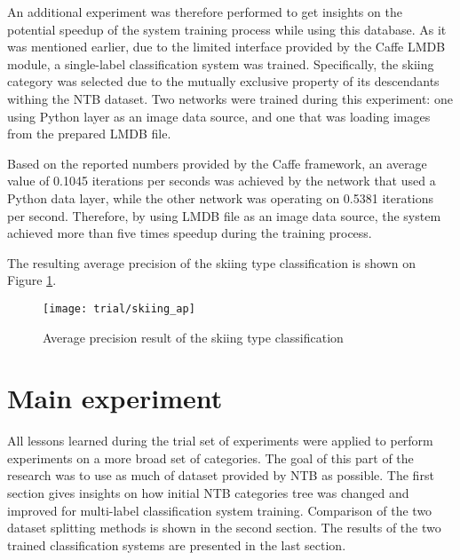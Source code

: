     An additional experiment was therefore performed to get insights on the potential speedup of the system training process while using this database. As it was mentioned earlier, due to the limited interface provided by the Caffe LMDB module, a single-label classification system was trained. Specifically, the skiing category was selected due to the mutually exclusive property of its descendants withing the NTB dataset. Two networks were trained during this experiment: one using Python layer as an image data source, and one that was loading images from the prepared LMDB file.
    
    Based on the reported numbers provided by the Caffe framework, an average value of 0.1045 iterations per seconds was achieved by the network that used a Python data layer, while the other network was operating on 0.5381 iterations per second. Therefore, by using LMDB file as an image data source, the system achieved more than five times speedup during the training process. 
    
    The resulting average precision of the skiing type classification is shown on Figure \ref{fig:trial-skiing-ap}.
    
    \begin{figure}[H]
        \centering
        \texttt{[image: trial/skiing\_ap]}
        \caption[Trial experiment. Average precision result of the skiing type classification]{Average precision result of the skiing type classification}
        \label{fig:trial-skiing-ap}
    \end{figure}
    

\section{Main experiment}
All lessons learned during the trial set of experiments were applied to perform experiments on a more broad set of categories. The goal of this part of the research was to use as much of dataset provided by NTB as possible. The first section gives insights on how initial NTB categories tree was changed and improved for multi-label classification system training. Comparison of the two dataset splitting methods is shown in the second section. The results of the two trained classification systems are presented in the last section.

